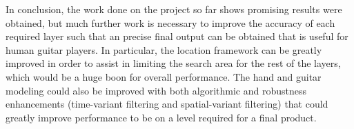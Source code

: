 In conclusion, the work done on the project so far shows promising results were obtained,
but much further work is necessary to improve the accuracy of each required layer such that
an precise final output can be obtained that is useful for human guitar players.
In particular, the location framework can be greatly improved in order to assist in
limiting the search area for the rest of the layers, which would be a huge boon for overall
performance. The hand and guitar modeling could also be improved with both algorithmic and
robustness enhancements (time-variant filtering and spatial-variant filtering) that could
greatly improve performance to be on a level required for a final product.
